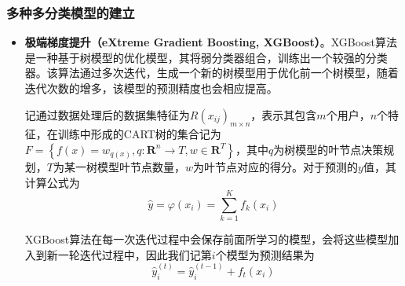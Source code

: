 \documentclass{MathorCupmodeling}
\begin{document}
	\subsubsection{多种多分类模型的建立}
	\begin{itemize}
		\item \textbf{极端梯度提升（eXtreme Gradient Boosting, XGBoost）}。XGBoost算法是一种基于树模型的优化模型，其将弱分类器组合，训练出一个较强的分类器。该算法通过多次迭代，生成一个新的树模型用于优化前一个树模型，随着迭代次数的增多，该模型的预测精度也会相应提高\textcolor{blue}{\cite{pxgboost1}}。

		记通过数据处理后的数据集特征为$R\left(x_{ij}\right)_{m\times n}$，表示其包含$m$个用户，$n$个特征，在训练中形成的CART树的集合记为$F=\left\{f\left(x\right)=w_{q\left(x\right)},q:\mathbf{R}^n\to T,w\in \mathbf{R}^T\right\}$，其中$q$为树模型的叶节点决策规划，$T$为某一树模型叶节点数量，$w$为叶节点对应的得分\textcolor{blue}{\cite{pxgboost2}}。对于预测的$y$值，其计算公式为
		\begin{equation}
			\hat{y}=\varphi \left( x_i \right) =\sum\limits_{k=1}^K{f_k\left( x_i \right)} \label{fXGBoostypre}
		\end{equation}
	
		XGBoost算法在每一次迭代过程中会保存前面所学习的模型，会将这些模型加入到新一轮迭代过程中，因此我们记第$i$个模型为预测结果为
		\begin{equation}
			\hat{y}_{i}^{\left(t\right)}=\hat{y}_{i}^{\left(t-1\right)}+f_t\left(x_i\right) \label{fXGBoostyprei}
		\end{equation}
		

\end{itemize}
\end{document}

